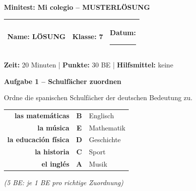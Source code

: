 \documentclass[11pt, a4paper]{article}
\newcommand{\fachfarbe}{spanisch}
\newcommand{\thema}{Minitest: Mi colegio -- MUSTERLÖSUNG}
\newcommand{\klasse}{7}
\newcommand{\maxpunkte}{30}
\newcommand{\zeit}{20 Minuten}
\newcommand{\punktebox}[1]{\hfill\fbox{\small \_\_\_/#1}}
\newcommand{\luecke}[1]{\rule{#1}{0.4pt}}
\newcommand{\lsg}[1]{\textcolor{loesung}{\textbf{#1}}}
\newenvironment{aufgabe}[1]{%
    \vspace{12pt}
    \noindent\textbf{\textcolor{\fachfarbe}{Aufgabe #1}}
    \vspace{6pt}
    \begin{list}{}{\leftmargin=0pt}
    \item[]
}{%
    \end{list}
}
\newcommand{\es}[1]{\textcolor{\fachfarbe}{\textbf{#1}}}
\begin{document}

\begin{center}
    {\Large\bfseries\textcolor{loesung}{\thema}}
\end{center}

\vspace{5pt}

\noindent
\begin{tabularx}{\textwidth}{|X|X|X|}
\hline
\textbf{Name:} \lsg{LÖSUNG} &
\textbf{Klasse:} \klasse &
\textbf{Datum:} \luecke{2cm} \\
\hline
\end{tabularx}

\vspace{10pt}

\begin{infobox}
\textbf{Zeit:} \zeit{} | \textbf{Punkte:} \maxpunkte{} BE | \textbf{Hilfsmittel:} keine
\end{infobox}

\vspace{15pt}


\begin{aufgabe}{1 -- Schulfächer zuordnen}
Ordne die spanischen Schulfächer der deutschen Bedeutung zu. \punktebox{5}
\end{aufgabe}

\begin{center}
\begin{tabular}{rcl}
\es{las matemáticas} & \lsg{B} & Englisch \\[0.6em]
\es{la música} & \lsg{E} & Mathematik \\[0.6em]
\es{la educación física} & \lsg{D} & Geschichte \\[0.6em]
\es{la historia} & \lsg{C} & Sport \\[0.6em]
\es{el inglés} & \lsg{A} & Musik \\
\end{tabular}
\end{center}

\textcolor{loesung}{\textit{(5 BE: je 1 BE pro richtige Zuordnung)}}

\vspace{12pt}
\end{document}
